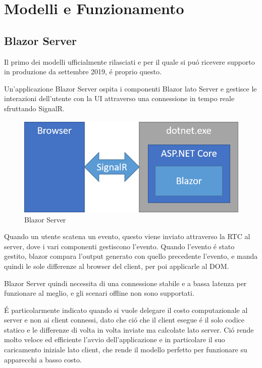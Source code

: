 \chapter{Modelli e Funzionamento}\label{cap:modefunz}
\section{Blazor Server}\label{sez:bserver}
Il primo dei modelli ufficialmente rilasciati e per il quale si pu\'o ricevere supporto in produzione da settembre 2019\cite{blazorServerRelease}, \'e proprio questo.

Un'applicazione Blazor Server ospita i componenti Blazor lato Server e gestisce le interazioni dell'utente con la UI attraverso una connessione in tempo reale sfruttando SignalR.

\begin{figure}[H]
	\centerline{\includegraphics[scale=0.6]{figure/blazor-server.png}}
	\caption{Blazor Server}
	\label{fig:BlazorServer}
\end{figure}

Quando un utente scatena un evento, questo viene inviato attraverso la RTC al server, dove i vari componenti gestiscono l'evento.
Quando l'evento \'e stato gestito, blazor compara l'output generato con quello precedente l'evento, e manda quindi le sole differenze al browser del client, per poi applicarle al DOM.\cite{blazorModelsScenarios}

Blazor Server quindi necessita di una connessione stabile e a bassa latenza per funzionare al meglio, e gli scenari offline non sono supportati.

\'E particolarmente indicato quando si vuole delegare il costo computazionale al server e non ai client connessi, dato che ci\'o che il client esegue \'e il solo codice statico e le differenze di volta in volta inviate ma calcolate lato server.
Ci\'o rende molto veloce ed efficiente l'avvio dell'applicazione e in particolare il suo caricamento iniziale lato client, che rende il modello perfetto per funzionare su apparecchi a basso costo.
\pagebreak


